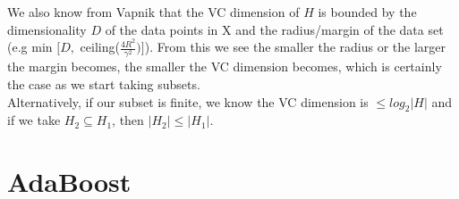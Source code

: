 \documentclass[11pt,a4paper]{article}
\begin{document}
\begin{itemize}
				We also know from Vapnik that the VC dimension of $H$ is bounded by the dimensionality $D$ of the data points in X and the radius/margin of the data set (e.g min $\Big[ D,$ ceiling($\frac{4R^2}{\gamma^2}) \Big]$). From this we see the smaller the radius or the larger the margin becomes, the smaller the VC dimension becomes, which is certainly the case as we start taking subsets.\\
				
				Alternatively, if our subset is finite, we know the VC dimension is $\leq log_2 \vert H \vert$ and if we take $H_2 \subseteq H_1$, then $\vert H_2 \vert \leq \vert H_1 \vert$.
		\end{itemize}
	
	\section{AdaBoost}
\end{document}
